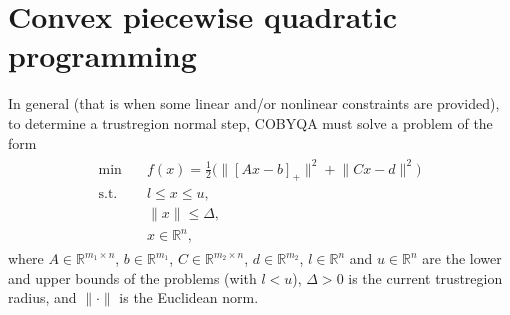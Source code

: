 \documentclass[letterpaper,10pt,english]{sphinxmanual}
\newcommand{\norm}[2][]{#1\lVert#2#1\rVert}
\def\R{\ensuremath{\mathds{R}}}
\begin{document}
\section{Convex piecewise quadratic programming}
\label{\detokenize{algo/linalg.cpqp:convex-piecewise-quadratic-programming}}\label{\detokenize{algo/linalg.cpqp:linalg-cpqp}}\label{\detokenize{algo/linalg.cpqp::doc}}
\sphinxAtStartPar
In general (that is when some linear and/or nonlinear constraints are
provided), to determine a trust\sphinxhyphen{}region normal step, COBYQA must solve a problem
of the form
\begin{equation}\label{equation:algo/linalg.cpqp:cpqp}
\begin{split}\begin{array}{ll}
    \min        & \quad f(x) = \frac{1}{2} \big(\norm{[Ax - b]_+}^2 + \norm{Cx - d}^2\big)\\
    \text{s.t.} & \quad l \le x \le u,\\
                & \quad \norm{x} \le \Delta,\\
                & \quad x \in \R^n,
\end{array}\end{split}
\end{equation}
\sphinxAtStartPar
where \(A \in \R^{m_1 \times n}\), \(b \in \R^{m_1}\),
\(C \in \R^{m_2 \times n}\), \(d \in \R^{m_2}\), \(l \in \R^n\) and
\(u \in \R^n\) are the lower and upper bounds of the problems
(with \(l < u\)), \(\Delta > 0\) is the current trust\sphinxhyphen{}region radius,
and \(\norm{\cdot}\) is the Euclidean norm.

\label{\detokenize{algo/linalg.cpqp:bibliography-1}}
\end{document}
